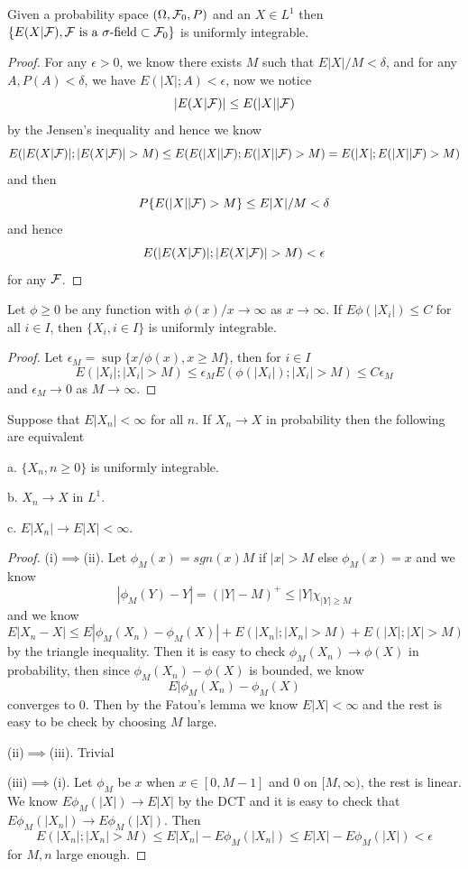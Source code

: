 \begin{theorem}
    Given a probability space $(\Omega,\mathcal{F}_0,P)$ and an $X\in L^1$ then $\{E(X|\mathcal{F}), \mathcal{F}\text{ is a }\sigma\text{-field} \subset \mathcal{F}_0\}$ is uniformly integrable.
\end{theorem}
\begin{proof}
    For any $\epsilon > 0$, we know there exists $M$ such that $E|X|/M < \delta$, and for any $A,P(A)<\delta$, we have $E(|X|;A)<\epsilon$, now we notice
    \[
    |E(X|\mathcal{F})| \leq E(|X||\mathcal{F})
    \]
    by the Jensen's inequality and hence we know
    \[
    E(|E(X|\mathcal{F})|;|E(X|\mathcal{F})| > M) \leq E(E(|X||\mathcal{F});E(|X||\mathcal{F}) > M) = E(|X|;E(|X||\mathcal{F}) > M)
    \]
    and then
    \[
    P\{E(|X||\mathcal{F}) > M\} \leq E|X|/M < \delta
    \]
    and hence
    \[
    E(|E(X|\mathcal{F})|;|E(X|\mathcal{F})| > M) < \epsilon
    \]
    for any $\mathcal{F}$.
\end{proof}

\begin{theorem}
    Let $\phi \geq 0$ be any function with $\phi(x)/x \to \infty$ as $x\to\infty$. If $E\phi(|X_i|) \leq C$ for all $i \in I$, then $\{X_i, i\in I\}$ is uniformly integrable.
\end{theorem}
\begin{proof}
    Let $\epsilon_M = \sup\{x/\phi(x), x\geq M\}$, then for $i\in I$
    \[E(|X_i|;|X_i| > M) \leq \epsilon_M E(\phi(|X_i|); |X_i| > M) \leq C\epsilon_M\]
    and $\epsilon_M \to 0$ as $M\to\infty$.
\end{proof}

\begin{theorem}
    Suppose that $E|X_n| <\infty$ for all $n$. If $X_n\to X$ in probability then the following are equivalent\par
    a. $\{X_n, n\geq 0\}$ is uniformly integrable.\par
    b. $X_n\to X$ in $L^1$.\par
    c. $E|X_n| \to E|X| < \infty$.
\end{theorem}
\begin{proof}
    (i)$\implies$(ii). Let $\phi_M(x) = sgn(x)M$ if $|x|>M$ else $\phi_M(x) = x$ and we know
    \[
    |\phi_M(Y)-Y| = (|Y|-M)^+ \leq |Y|\chi_{|Y|\geq M}
    \]
    and we know
    \[
    E|X_n-X| \leq E|\phi_M(X_n)-\phi_M(X)| + E(|X_n|;|X_n| > M) + E(|X|;|X| > M)
    \]
    by the triangle inequality. Then it is easy to check $\phi_M(X_n) \to \phi(X)$ in probability, then since $\phi_M(X_n)-\phi(X)$ is bounded, we know
    \[E|\phi_M(X_n)-\phi_M(X)\]
    converges to $0$. Then by the Fatou's lemma we know $E|X| < \infty$ and the rest is easy to be check by choosing $M$ large.\par
    (ii)$\implies$(iii). Trivial\par
    (iii)$\implies$(i). Let $\phi_M$ be $x$ when $x \in [0,M-1]$ and $0$ on $[M,\infty)$, the rest is linear. We know $E\phi_M(|X|) \to E|X|$ by the DCT and it is easy to check that $E\phi_M(|X_n|) \to E\phi_M(|X|)$. Then
    \[E(|X_n|; |X_n|>M) \leq E|X_n| - E\phi_M(|X_n|) \leq E|X| - E\phi_M(|X|) < \epsilon\]
    for $M, n$ large enough.
\end{proof}

